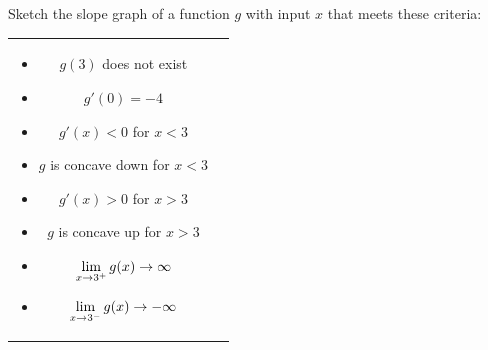\documentclass[notes]{subfiles}
\begin{document}
		\begin{ex}
			Sketch the slope graph of a function $g$ with input $x$ that meets these criteria:\\[5pt]
				\begin{tabular}{cc}
				\begin{minipage}{3.5in}
				\begin{itemize}
					\item $g(3)$ does not exist
					\item $g'(0) = -4$
					\item $g'(x) < 0$ for $x < 3$
					\item $g$ is concave down for $x < 3$
				\end{itemize}
				\end{minipage}
				\begin{minipage}{3.5in}
				\begin{itemize}
					\item $g'(x) > 0$ for $x > 3$
					\item $g$ is concave up for $x > 3$
					\item $\displaystyle \lim_{x\to 3^+} g(x) \to \infty$
					\item $\displaystyle \lim_{x\to 3^-} g(x) \to -\infty$
				\end{itemize}
				\end{minipage}
				\end{tabular}
		\end{ex}
\end{document}
